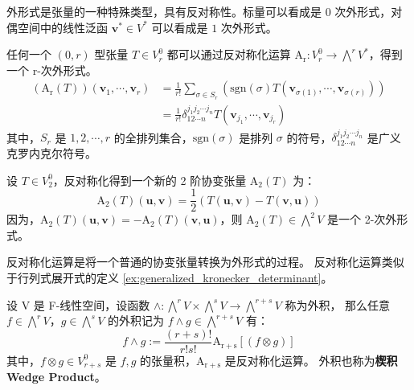 \begin{note}
    外形式是张量的一种特殊类型，具有反对称性。标量可以看成是 $0$ 次外形式，对偶空间中的线性泛函 $\mathbf{v}^*\in V^*$ 可以看成是 $1$ 次外形式。
\end{note}
\vspace{1em}

\begin{definition}[反对称化运算]
    任何一个 $(0,r)$ 型张量 $T\in V^0_r$ 都可以通过反对称化运算 $\mathrm{A_r}:V^0_r\to \bigwedge^rV^*$，得到一个 r-次外形式。
    \begin{align*}
        (\mathrm{A_r}(T))(\mathbf{v}_1,\cdots,\mathbf{v}_r) &= \frac{1}{r!}\sum_{\sigma \in S_r} \left( \mathrm{sgn}(\sigma) T(\mathbf{v}_{\sigma(1)},\cdots,\mathbf{v}_{\sigma(r)}) \right) \\
        &= \frac{1}{r!} \delta_{1 2 \cdots n}^{j_1 j_2 \cdots j_n}  T(\mathbf{v}_{j_1},\cdots,\mathbf{v}_{j_r})
    \end{align*}
    其中，$S_r$ 是 $1,2,\cdots,r$ 的全排列集合，$\mathrm{sgn}(\sigma)$ 是排列 $\sigma$ 的符号，$\delta_{1 2 \cdots n}^{j_1 j_2 \cdots j_n}$ 是广义克罗内克尔符号。
\end{definition}

\begin{example}
    设 $T\in V^0_2$，反对称化得到一个新的 2 阶协变张量 $\mathrm{A_2}(T)$ 为：
    \[
        \mathrm{A_2}(T)(\mathbf{u},\mathbf{v}) = \frac{1}{2}(T(\mathbf{u},\mathbf{v}) - T(\mathbf{v},\mathbf{u}))
    \]
    因为，$\mathrm{A_2}(T)(\mathbf{u},\mathbf{v}) = -\mathrm{A_2}(T)(\mathbf{v},\mathbf{u})$，则 $\mathrm{A_2}(T) \in \bigwedge^2 V$ 是一个 2-次外形式。
    \label{ex:2-exterior_form}
\end{example}

\begin{note}
    反对称化运算是将一个普通的协变张量转换为外形式的过程。
    反对称化运算类似于行列式展开式的定义 \ref{ex:generalized_kronecker_determinant}。
\end{note}
\vspace{1em}

\begin{definition}
    设 V 是 F-线性空间，设函数 $\wedge : \bigwedge^rV \times \bigwedge^sV \to \bigwedge^{r+s}V$ 称为外积，
    那么任意 $f\in \bigwedge^rV$，$g\in \bigwedge^sV$ 的外积记为 $f\wedge g \in \bigwedge^{r+s}V$ 有：
    \[
        f\wedge g := \frac{(r+s)!}{r!s!} \mathrm{A_{r+s}}[(f\otimes g)]
    \]
    其中，$f\otimes g \in V^0_{r+s}$ 是 $f,g$ 的张量积，$\mathrm{A_{r+s}}$ 是反对称化运算。
    外积也称为\textbf{楔积 Wedge Product}。
    \label{def:exterior_product}
\end{definition}

